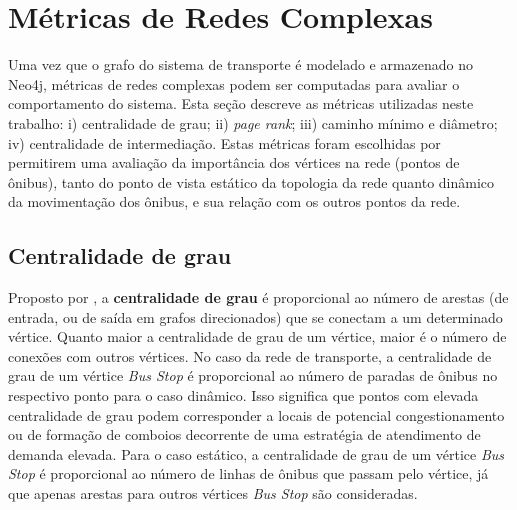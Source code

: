 



\section{Métricas de Redes Complexas} \label{sec:metr}

Uma vez que o grafo do sistema de transporte é modelado e armazenado no Neo4j, métricas de redes complexas podem ser computadas para avaliar o comportamento do sistema. Esta seção descreve as métricas utilizadas neste trabalho: i) centralidade de grau; ii) \emph{page rank}; iii) caminho mínimo e diâmetro; iv) centralidade de intermediação. Estas métricas foram escolhidas por permitirem uma avaliação da importância dos vértices na rede (pontos de ônibus), tanto do ponto de vista estático da topologia da rede quanto dinâmico da movimentação dos ônibus, e sua relação com os outros pontos da rede.

\subsection{Centralidade de grau}

Proposto por \cite{free:79}, a {\bf centralidade de grau} é proporcional ao número de arestas (de entrada, ou de saída em grafos direcionados) que se conectam a um determinado vértice. Quanto maior a centralidade de grau de um vértice, maior é o número de conexões com outros vértices. No caso da rede de transporte, a centralidade de grau de um vértice \emph{Bus Stop} é proporcional ao número de paradas de ônibus no respectivo ponto para o caso dinâmico. Isso significa que pontos com elevada centralidade de grau podem corresponder a locais de potencial congestionamento ou de formação de comboios decorrente de uma estratégia de atendimento de demanda elevada. Para o caso estático, a centralidade de grau de um vértice \emph{Bus Stop} é proporcional ao número de linhas de ônibus que passam pelo vértice, já que apenas arestas para outros vértices \emph{Bus Stop} são consideradas.

